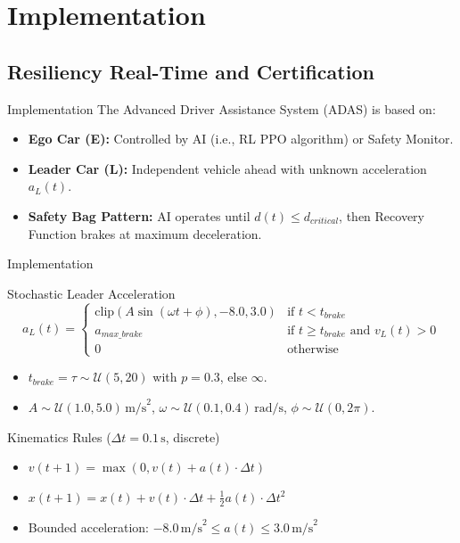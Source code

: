 \section{Implementation}

\subsection{Resiliency Real-Time and Certification}

\begin{frame}{Implementation}
    The Advanced Driver Assistance System (ADAS) is based on:
        \begin{itemize}
            \item \textbf{Ego Car (E):} Controlled by AI (i.e., RL PPO algorithm) or Safety Monitor.
            \item \textbf{Leader Car (L):} Independent vehicle ahead with unknown acceleration $a_L(t)$.
            \item \textbf{Safety Bag Pattern:} AI operates until $d(t) \le d_{critical}$, then Recovery Function brakes at maximum deceleration.
        \end{itemize}
\end{frame}

\begin{frame}{Implementation}
    \begin{block}{Stochastic Leader Acceleration}
        \begin{equation*}
            a_L(t) =
            \begin{cases}
                \text{clip}\left(A \sin(\omega t + \phi), -8.0, 3.0\right) & \text{if } t < t_{brake} \\
                a_{max\_brake} & \text{if } t \ge t_{brake} \text{ and } v_L(t) > 0 \\
                0 & \text{otherwise}
            \end{cases}
        \end{equation*}
        \begin{itemize}
            \item $t_{brake} = \tau \sim \mathcal{U}(5, 20)$ with $p = 0.3$, else $\infty$.
            \item $A \sim \mathcal{U}(1.0, 5.0)\,\text{m/s}^2$, $\omega \sim \mathcal{U}(0.1, 0.4)\,\text{rad/s}$, $\phi \sim \mathcal{U}(0, 2\pi)$.
        \end{itemize}
    \end{block}
    \begin{block}{Kinematics Rules ($\Delta t = 0.1\,\text{s}$, discrete)}
        \begin{itemize}
            \item $v(t+1) = \max\left(0, v(t) + a(t) \cdot \Delta t\right)$
            \item $x(t+1) = x(t) + v(t) \cdot \Delta t + \frac{1}{2}a(t) \cdot \Delta t^2$
            \item Bounded acceleration: $-8.0 \,\text{m/s}^2 \le a(t) \le 3.0\,\text{m/s}^2$
        \end{itemize}
    \end{block}
\end{frame}

